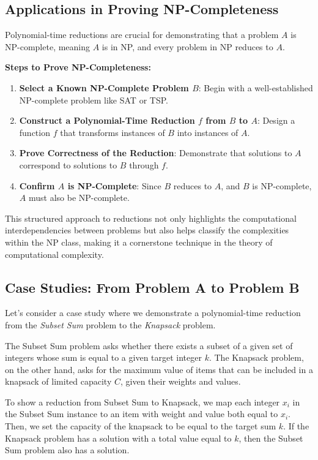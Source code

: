 \subsection{Applications in Proving NP-Completeness}
Polynomial-time reductions are crucial for demonstrating that a problem \(A\) is NP-complete, meaning \(A\) is in NP, and every problem in NP reduces to \(A\).

\textbf{Steps to Prove NP-Completeness:}
\begin{enumerate}
    \item \textbf{Select a Known NP-Complete Problem \(B\)}: Begin with a well-established NP-complete problem like SAT or TSP.
    \item \textbf{Construct a Polynomial-Time Reduction \(f\) from \(B\) to \(A\)}: Design a function \(f\) that transforms instances of \(B\) into instances of \(A\).
    \item \textbf{Prove Correctness of the Reduction}: Demonstrate that solutions to \(A\) correspond to solutions to \(B\) through \(f\).
    \item \textbf{Confirm \(A\) is NP-Complete}: Since \(B\) reduces to \(A\), and \(B\) is NP-complete, \(A\) must also be NP-complete.
\end{enumerate}

This structured approach to reductions not only highlights the computational interdependencies between problems but also helps classify the complexities within the NP class, making it a cornerstone technique in the theory of computational complexity.


\subsection{Case Studies: From Problem A to Problem B}

Let's consider a case study where we demonstrate a polynomial-time reduction from the \textit{Subset Sum} problem to the \textit{Knapsack} problem.

The Subset Sum problem asks whether there exists a subset of a given set of integers whose sum is equal to a given target integer \(k\). The Knapsack problem, on the other hand, asks for the maximum value of items that can be included in a knapsack of limited capacity \(C\), given their weights and values.

To show a reduction from Subset Sum to Knapsack, we map each integer \(x_i\) in the Subset Sum instance to an item with weight and value both equal to \(x_i\). Then, we set the capacity of the knapsack to be equal to the target sum \(k\). If the Knapsack problem has a solution with a total value equal to \(k\), then the Subset Sum problem also has a solution. 

